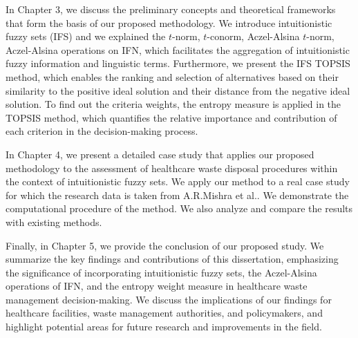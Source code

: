 \vspace{5mm}

In Chapter 3, we discuss the preliminary concepts and theoretical frameworks that form the basis of our proposed methodology. We introduce intuitionistic fuzzy sets (IFS) and we explained the $t$-norm, $t$-conorm, Aczel-Alsina $t$-norm, Aczel-Alsina operations on IFN, which facilitates the aggregation of intuitionistic fuzzy information and linguistic terms. Furthermore, we present the IFS TOPSIS method, which enables the ranking and selection of alternatives based on their similarity to the positive ideal solution and their distance from the negative ideal solution. To find out the criteria weights, the entropy measure is applied in the TOPSIS method, which quantifies the relative importance and contribution of each criterion in the decision-making process.

\vspace{5mm}

In Chapter 4, we present a detailed case study that applies our proposed methodology to the assessment of healthcare waste disposal procedures within the context of intuitionistic fuzzy sets. We apply our method to a real case study for which the research data is taken from A.R.Mishra et al.\cite{7}. We demonstrate the computational procedure of the method. We also analyze and compare the results with existing methods.

\vspace{5mm}

Finally, in Chapter 5, we provide the conclusion of our proposed study. We summarize the key findings and contributions of this dissertation, emphasizing the significance of incorporating intuitionistic fuzzy sets, the Aczel-Alsina operations of IFN, and the entropy weight measure in healthcare waste management decision-making. We discuss the implications of our findings for healthcare facilities, waste management authorities, and policymakers, and highlight potential areas for future research and improvements in the field. 